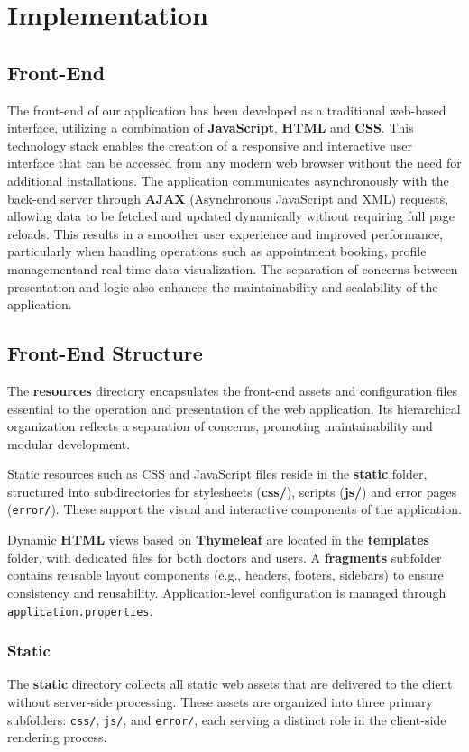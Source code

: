 \chapter{Implementation}
\section{Front-End}
The front-end of our application has been developed as a traditional web-based interface, utilizing a combination of \textbf{JavaScript}, \textbf{HTML} and \textbf{CSS}. This technology stack enables the creation of a responsive and interactive user interface that can be accessed from any modern web browser without the need for additional installations. The application communicates asynchronously with the back-end server through \textbf{AJAX} (Asynchronous JavaScript and XML) requests, allowing data to be fetched and updated dynamically without requiring full page reloads. This results in a smoother user experience and improved performance, particularly when handling operations such as appointment booking, profile managementand real-time data visualization. The separation of concerns between presentation and logic also enhances the maintainability and scalability of the application.

\section{Front-End Structure}
The \textbf{resources} directory encapsulates the front-end assets and configuration files essential to the operation and presentation of the web application. Its hierarchical organization reflects a separation of concerns, promoting maintainability and modular development.

Static resources such as CSS and JavaScript files reside in the \textbf{static} folder, structured into subdirectories for stylesheets (\textbf{css/}), scripts (\textbf{js/}) and error pages (\texttt{error/}). These support the visual and interactive components of the application.

Dynamic \textbf{HTML} views based on \textbf{Thymeleaf} are located in the \textbf{templates} folder, with dedicated files for both doctors and users. A \textbf{fragments} subfolder contains reusable layout components (e.g., headers, footers, sidebars) to ensure consistency and reusability. Application-level configuration is managed through \texttt{application.properties}.

\subsection{Static}
The \textbf{static} directory collects all static web assets that are delivered to the client without server-side processing. These assets are organized into three primary subfolders: \texttt{css/}, \texttt{js/}, and \texttt{error/}, each serving a distinct role in the client-side rendering process.

